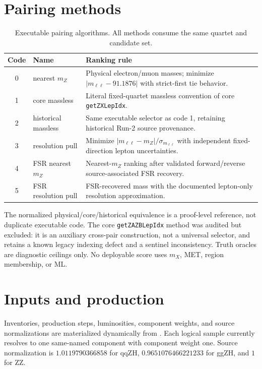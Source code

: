 \documentclass[11pt]{article}
\newcommand{\mZ}{m_{Z}}
\newcommand{\mX}{m_{X}}
\begin{document}
\section{Pairing methods}

\begin{table}[htbp]
\centering
\small
\caption{Executable pairing algorithms.  All methods consume the same quartet
and candidate set.}
\begin{tabularx}{\textwidth}{c l Y}
\toprule
Code & Name & Ranking rule \\
 & nearest $\mZ$ & Physical electron/muon masses; minimize
$|m_{\ell\ell}-91.1876|$ with strict-first tie behavior. \\
1 & core massless & Literal fixed-quartet massless convention of core
\texttt{getZXLepIdx}. \\
2 & historical massless & Same executable selector as code 1, retaining
historical Run-2 source provenance. \\
3 & resolution pull & Minimize $|m_{\ell\ell}-\mZ|/\sigma_{m_{\ell\ell}}$
with independent fixed-direction lepton uncertainties. \\
4 & FSR nearest $\mZ$ & Nearest-$\mZ$ ranking after validated forward/reverse
source-associated FSR recovery. \\
5 & FSR resolution pull & FSR-recovered mass with the documented lepton-only
resolution approximation. \\
\bottomrule
\end{tabularx}
\end{table}

The normalized physical/core/historical equivalence is a proof-level
reference, not duplicate executable code.  The core
\texttt{getZAZBLepIdx} method was audited but excluded: it is an auxiliary
cross-pair construction, not a universal selector, and retains a known legacy
indexing defect and a sentinel inconsistency.  Truth oracles are diagnostic
ceilings only.  No deployable score uses $\mX$, MET, region membership, or ML.

\section{Inputs and production}

Inventories, production steps, luminosities, component weights, and source
normalizations are materialized dynamically from
.  Each logical sample currently resolves to
one same-named component with component weight one.  Source normalization is
$1.0119790366858$ for qqZH, $0.9651076466221233$ for ggZH, and $1$ for ZZ.
\end{document}
